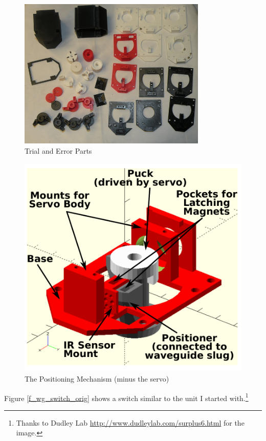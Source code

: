 \documentclass[12pt]{article}
\begin{document}
\begin{figure}[tb]
  \centering
  \includegraphics[width=0.8\textwidth]{TrialAndError1.jpg}
  \caption{\label{f_trial_and_error}Trial and Error Parts}
\end{figure}

\begin{figure}[thb]
\centering
    \includegraphics[width=\textwidth]{AssemblyView.pdf}
    \caption{\label{f_expview}The Positioning Mechanism (minus the servo)}  
\end{figure}

Figure \ref{f_wg_switch_orig} shows a switch similar to the unit I started
with.\footnote{Thanks to Dudley Lab \url{http://www.dudleylab.com/surplus6.html}
  for the image.}
\end{document}
